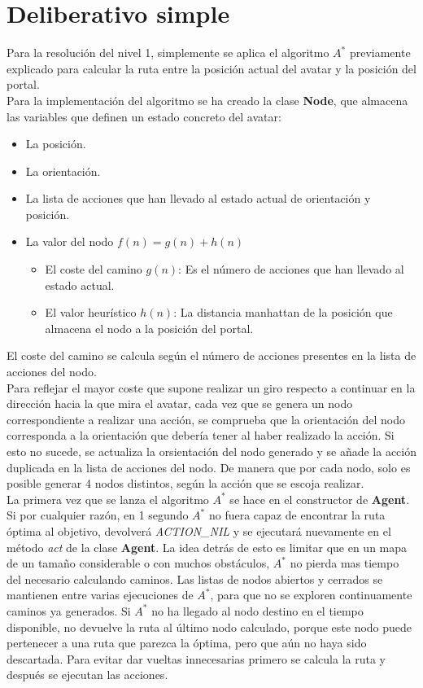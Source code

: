 \section{Deliberativo simple}
Para la resolución del nivel 1, simplemente se aplica el algoritmo $ A^{*} $ previamente explicado para calcular la ruta entre la posición actual del avatar y la posición del portal. \\
Para la implementación del algoritmo se ha creado la clase \textbf{Node}, que almacena las variables que definen un estado concreto del avatar:
\begin{itemize}
   \item La posición.
   \item La orientación.
   \item La lista de acciones que han llevado al estado actual de orientación y posición.
   \item La valor del nodo $ f(n) = g(n) + h(n) $
   \begin{itemize}
      \item El coste del camino $ g(n) $: Es el número de acciones que han llevado al estado actual.
      \item El valor heurístico $ h(n) $: La distancia manhattan de la posición que almacena el nodo a la posición del portal.
   \end{itemize}
\end{itemize}

El coste del camino se calcula según el número de acciones presentes en la lista de acciones del nodo.\\
Para reflejar el mayor coste que supone realizar un giro respecto a continuar en la dirección hacia la que mira el avatar, cada vez que se genera un nodo correspondiente a realizar una acción, se comprueba que la orientación del nodo corresponda a la orientación que debería tener al haber realizado la acción.
Si esto no sucede, se actualiza la orsientación del nodo generado y se añade la acción duplicada en la lista de acciones del nodo. De manera que por cada nodo, solo es posible generar 4 nodos distintos, según la acción que se escoja realizar.\\
La primera vez que se lanza el algoritmo $ A^{*} $ se hace en el constructor de \textbf{Agent}. Si por cualquier razón, en 1 segundo $ A^{*} $ no fuera capaz de encontrar la ruta óptima al objetivo, devolverá \emph{ACTION\_NIL} y se ejecutará nuevamente en el método \emph{act} de la clase \textbf{Agent}. La idea detrás de esto es limitar que en un mapa de un tamaño considerable o con muchos obstáculos, $ A^{*} $ no pierda mas tiempo del necesario calculando caminos. Las listas de nodos abiertos y cerrados se mantienen entre varias ejecuciones de $ A^{*} $, para que no se exploren continuamente caminos ya generados. Si $ A^{*} $ no ha llegado al nodo destino en el tiempo disponible, no devuelve la ruta al último nodo calculado, porque este nodo puede pertenecer a una ruta que parezca la óptima, pero que aún no haya sido descartada. Para evitar dar vueltas innecesarias primero se calcula la ruta y después se ejecutan las acciones.\\
\\

